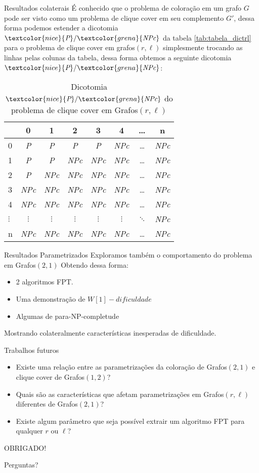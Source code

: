 \documentclass[9pt, compress]{beamer}
\renewcommand{\P}{\textcolor{nice}{\textit{P}}}
\newcommand{\NPc}{\textcolor{grena}{\textit{NPc}}}
\newcommand{\?}{\textcolor{warn}{\textit{?}}}
\begin{document}
     \begin{frame}{Resultados colaterais}
      É conhecido que o problema de coloração em um grafo $G$ pode ser visto como um problema de clique cover em seu complemento $G'$, dessa forma podemos estender a dicotomia $\P/\NPc$ da tabela \ref{tab:tabela_dictrl} para o problema de clique cover em grafos$(r,\ell)$ simplesmente trocando as linhas pelas colunas da tabela, dessa forma obtemos a seguinte dicotomia $\P/\NPc$:
\begin{table}[!htb]
	\center
	\begin{tabular}{l|*{7}c}
		\toprule
		\backslashbox{$r$}{$l$} & 0 & 1 & 2 & 3 & 4 & \ldots & n\\
		\midrule
		0 & \P & \P & \P & \P & \NPc & \ldots & \NPc\\
		1 & \P & \P & \NPc & \NPc & \NPc & \ldots & \NPc\\
		2 & \P & \NPc & \NPc & \NPc & \NPc & \ldots & \NPc\\
		3 & \NPc & \NPc & \NPc & \NPc & \NPc & \ldots & \NPc\\
		4 & \NPc & \NPc & \NPc & \NPc & \NPc & \ldots & \NPc\\
		$\vdots$ & $\vdots$ & $\vdots$ & $\vdots$ & $\vdots$ & $\vdots$ & $\ddots$ & \NPc\\
		n & \NPc & \NPc & \NPc & \NPc & \NPc & \ldots & \NPc\\
		\bottomrule
	\end{tabular}%
	\caption{Dicotomia $\P/\NPc$ do problema de clique cover em Grafos$(r,\ell)$}%
\end{table}%
     \end{frame}
     \begin{frame}{Resultados Parametrizados}
       Exploramos também o comportamento do problema em Grafos$(2,1)$ Obtendo dessa forma:
       \begin{itemize}
         \item 2 algoritmos FPT.
         \item Uma demonstração de $W[1]-dificuldade$
         \item Algumas de para-NP-completude
       \end{itemize}
        Mostrando colateralmente características inesperadas de dificuldade.
     \end{frame}
     \begin{frame}{Trabalhos futuros}
       \begin{itemize}
  \item Existe uma relação entre as parametrizações da coloração de Grafos$(2,1)$ e clique cover de Grafos$(1,2)$?
  \item Quais são as características que afetam parametrizações em Grafos$(r,\ell)$ diferentes de Grafos$(2,1)$?
  \item Existe algum parâmetro que seja possível extrair um algoritmo FPT para qualquer $r$ ou $\ell$?
\end{itemize}
     \end{frame}
     \begin{frame}[standout]
       OBRIGADO!
       
       Perguntas?
     \end{frame}
\end{document}
